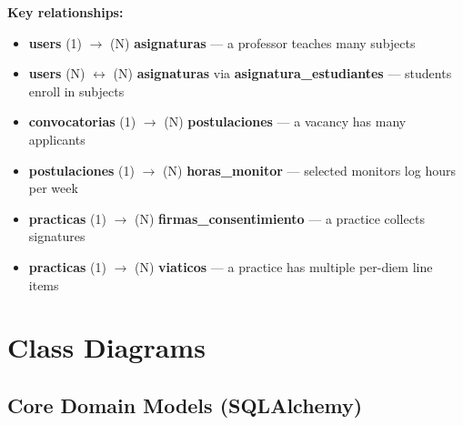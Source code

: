 \documentclass[12pt,a4paper]{article}
\begin{document}
\vspace{0.5cm}
\noindent\textbf{Key relationships:}
\begin{itemize}[noitemsep]
  \item \textbf{users} (1) $\to$ (N) \textbf{asignaturas} — a professor teaches many subjects
  \item \textbf{users} (N) $\leftrightarrow$ (N) \textbf{asignaturas} via \textbf{asignatura\_estudiantes} — students enroll in subjects
  \item \textbf{convocatorias} (1) $\to$ (N) \textbf{postulaciones} — a vacancy has many applicants
  \item \textbf{postulaciones} (1) $\to$ (N) \textbf{horas\_monitor} — selected monitors log hours per week
  \item \textbf{practicas} (1) $\to$ (N) \textbf{firmas\_consentimiento} — a practice collects signatures
  \item \textbf{practicas} (1) $\to$ (N) \textbf{viaticos} — a practice has multiple per-diem line items
\end{itemize}

\section{Class Diagrams}

\subsection{Core Domain Models (SQLAlchemy)}
\end{document}
